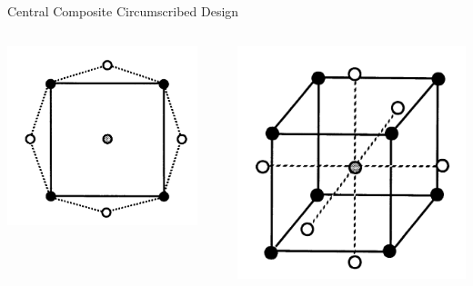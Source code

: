 \documentclass[14pt]{beamer}
\begin{document}
\begin{frame}{Central Composite Circumscribed Design}

\begin{columns}
    \begin{column}{0.5\textwidth}
      \includegraphics[width=0.9\textwidth]{3level2factorCCI.png}
    \end{column}
    \begin{column}{0.5\textwidth}
      \includegraphics[width=1.1\textwidth]{3level3factorCCI.png}
    \end{column}
  \end{columns}

\end{frame}
\end{document}
